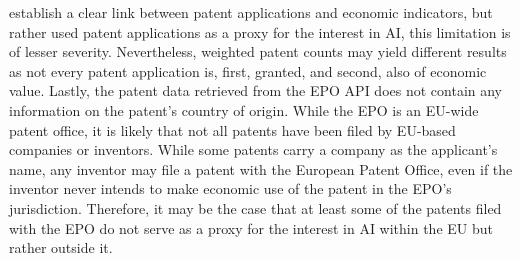 \documentclass[
  11,
  a4paperpaper,
]{article}
\begin{document}
establish a clear link between patent applications and economic
indicators, but rather used patent applications as a proxy for the
interest in AI, this limitation is of lesser severity. Nevertheless,
weighted patent counts may yield different results as not every patent
application is, first, granted, and second, also of economic value.
Lastly, the patent data retrieved from the EPO API does not contain any
information on the patent's country of origin. While the EPO is an
EU-wide patent office, it is likely that not all patents have been filed
by EU-based companies or inventors. While some patents carry a company
as the applicant's name, any inventor may file a patent with the
European Patent Office, even if the inventor never intends to make
economic use of the patent in the EPO's jurisdiction. Therefore, it may
be the case that at least some of the patents filed with the EPO do not
serve as a proxy for the interest in AI within the EU but rather outside
it.
\end{document}
